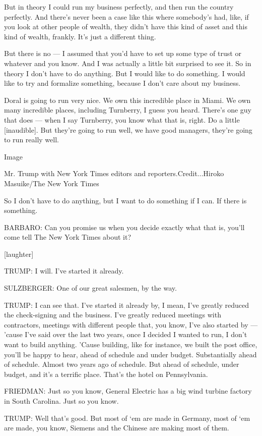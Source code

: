 But in theory I could run my business perfectly, and then run the
country perfectly. And there's never been a case like this where
somebody's had, like, if you look at other people of wealth, they didn't
have this kind of asset and this kind of wealth, frankly. It's just a
different thing.

But there is no --- I assumed that you'd have to set up some type of
trust or whatever and you know. And I was actually a little bit
surprised to see it. So in theory I don't have to do anything. But I
would like to do something. I would like to try and formalize something,
because I don't care about my business.

Doral is going to run very nice. We own this incredible place in Miami.
We own many incredible places, including Turnberry, I guess you heard.
There's one guy that does --- when I say Turnberry, you know what that
is, right. Do a little {[}inaudible{]}. But they're going to run well,
we have good managers, they're going to run really well.

Image

Mr. Trump with New York Times editors and reporters.Credit...Hiroko
Masuike/The New York Times

So I don't have to do anything, but I want to do something if I can. If
there is something.

BARBARO: Can you promise us when you decide exactly what that is, you'll
come tell The New York Times about it?

{[}laughter{]}

TRUMP: I will. I've started it already.

SULZBERGER: One of our great salesmen, by the way.

TRUMP: I can see that. I've started it already by, I mean, I've greatly
reduced the check-signing and the business. I've greatly reduced
meetings with contractors, meetings with different people that, you
know, I've also started by --- 'cause I've said over the last two years,
once I decided I wanted to run, I don't want to build anything. 'Cause
building, like for instance, we built the post office, you'll be happy
to hear, ahead of schedule and under budget. Substantially ahead of
schedule. Almost two years ago of schedule. But ahead of schedule, under
budget, and it's a terrific place. That's the hotel on Pennsylvania.

FRIEDMAN: Just so you know, General Electric has a big wind turbine
factory in South Carolina. Just so you know.

TRUMP: Well that's good. But most of `em are made in Germany, most of
`em are made, you know, Siemens and the Chinese are making most of them.

